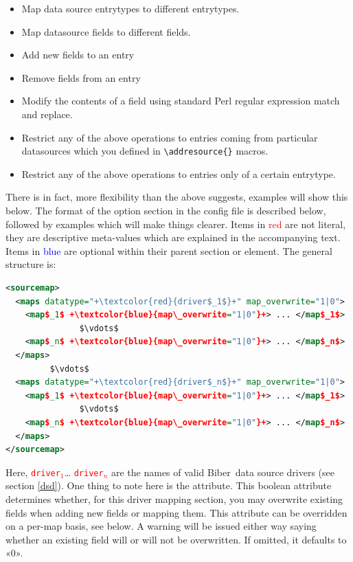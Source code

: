 \documentclass{ltxdockit}
\newcommand*{\biber}{Biber\xspace}
\begin{document}
\begin{itemize}
\item Map data source entrytypes to different entrytypes.
\item Map datasource fields to different fields.
\item Add new fields to an entry
\item Remove fields from an entry
\item Modify the contents of a field using standard Perl regular expression
  match and replace.
\item Restrict any of the above operations to entries coming from
  particular datasources which you defined in \verb+\addresource{}+ macros.
\item Restrict any of the above operations to entries only of a certain
  entrytype.
\end{itemize}

\noindent There is in fact, more flexibility than the above suggests,
examples will show this below. The format of the  option
section in the config file is described below, followed by examples which
will make things clearer. Items in \textcolor{red}{red} are not literal,
they are descriptive meta-values which are explained in the accompanying
text. Items in \textcolor{blue}{blue} are optional within their parent
section or element. The general structure is:

\lstset{showspaces=false}
\lstset{showstringspaces=false}
\begin{lstlisting}[language=xml,escapechar=+,mathescape=true]
<sourcemap>
  <maps datatype="+\textcolor{red}{driver$_1$}+" map_overwrite="1|0">
    <map$_1$ +\textcolor{blue}{map\_overwrite="1|0"}+> ... </map$_1$>
               $\vdots$
    <map$_n$ +\textcolor{blue}{map\_overwrite="1|0"}+> ... </map$_n$>
  </maps>
         $\vdots$
  <maps datatype="+\textcolor{red}{driver$_n$}+" map_overwrite="1|0">
    <map$_1$ +\textcolor{blue}{map\_overwrite="1|0"}+> ... </map$_1$>
               $\vdots$
    <map$_n$ +\textcolor{blue}{map\_overwrite="1|0"}+> ... </map$_n$>
  </maps>
</sourcemap>
\end{lstlisting}

\noindent Here, \textcolor{red}{\texttt{driver$_1$}}\ldots
\textcolor{red}{\texttt{driver$_n$}} are the names of valid \biber\ data
source drivers (see section \ref{dsd}). One thing to note here is the
 attribute. This boolean attribute determines whether,
for this driver mapping section, you may overwrite existing fields when
adding new fields or mapping them. This attribute can be overridden on a
per-map basis, see below. A warning will be issued either way saying
whether an existing field will or will not be overwritten. If omitted, it
defaults to «0».
\end{document}
